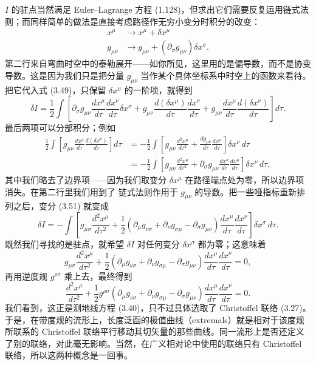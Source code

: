 $I$ 的驻点当然满足 Euler–Lagrange 方程 (1.128)，但求出它们需要反复运用链式法则；而同样简单的做法是直接考虑路径作无穷小变分时积分的改变：
\begin{align*}
x^\mu &\rightarrow x^\mu + \delta x^\mu\\
g_{\mu\nu} &\rightarrow g_{\mu\nu} + (\partial_\sigma g_{\mu\nu})\delta x^\sigma.
\tag{3.50}
\end{align*}
第二行来自弯曲时空中的泰勒展开——如你所见，这里用的是偏导数，而不是协变导数。这是因为我们只是把分量 $g_{\mu\nu}$ 当作某个具体坐标系中时空上的函数来看待。把它代入式 (3.49)，只保留 $\delta x^\mu$ 的一阶项，就得到
\begin{equation*}
\delta I = \frac{1}{2}\int\left[\partial_\sigma g_{\mu\nu}\frac{dx^\mu}{d\tau}\frac{dx^\nu}{d\tau}\delta x^\sigma + g_{\mu\nu}\frac{d(\delta x^\mu)}{d\tau}\frac{dx^\nu}{d\tau} + g_{\mu\nu}\frac{dx^\mu}{d\tau}\frac{d(\delta x^\nu)}{d\tau}\right]d\tau.
\tag{3.51}
\end{equation*}
最后两项可以分部积分；例如
\begin{align*}
\frac{1}{2}\int\left[g_{\mu\nu}\frac{dx^\mu}{d\tau}\frac{d(\delta x^\nu)}{d\tau}\right]d\tau &= -\frac{1}{2}\int\left[g_{\mu\nu}\frac{d^2x^\mu}{d\tau^2} + \frac{dg_{\mu\nu}}{d\tau}\frac{dx^\mu}{d\tau}\right]\delta x^\nu\,d\tau\\
&= -\frac{1}{2}\int\left[g_{\mu\nu}\frac{d^2x^\mu}{d\tau^2} + \partial_\sigma g_{\mu\nu}\frac{dx^\sigma}{d\tau}\frac{dx^\mu}{d\tau}\right]\delta x^\nu\,d\tau,
\tag{3.52}
\end{align*}
其中我们略去了边界项——因为我们取变分 $\delta x^\mu$ 在路径端点处为零，所以边界项消失。在第二行里我们用到了
链式法则作用于 $g_{\mu\nu}$ 的导数。把一些哑指标重新排列之后，变分 (3.51) 就变成
\begin{equation*}
\delta I = -\int\left[g_{\mu\sigma}\frac{d^2x^\mu}{d\tau^2} + \frac{1}{2}\left(\partial_\mu g_{\nu\sigma} + \partial_\nu g_{\sigma\mu} - \partial_\sigma g_{\mu\nu}\right)\frac{dx^\mu}{d\tau}\frac{dx^\nu}{d\tau}\right]\delta x^\sigma\,d\tau.
\tag{3.53}
\end{equation*}
既然我们寻找的是驻点，就希望 $\delta I$ 对任何变分 $\delta x^\sigma$ 都为零；这意味着
\begin{equation*}
g_{\mu\sigma}\frac{d^2x^\mu}{d\tau^2} + \frac{1}{2}\left(\partial_\mu g_{\nu\sigma} + \partial_\nu g_{\sigma\mu} - \partial_\sigma g_{\mu\nu}\right)\frac{dx^\mu}{d\tau}\frac{dx^\nu}{d\tau} = 0,
\tag{3.54}
\end{equation*}
再用逆度规 $g^{\rho\sigma}$ 乘上去，最终得到
\begin{equation*}
\frac{d^2x^\rho}{d\tau^2} + \frac{1}{2}g^{\rho\sigma}\left(\partial_\mu g_{\nu\sigma} + \partial_\nu g_{\sigma\mu} - \partial_\sigma g_{\mu\nu}\right)\frac{dx^\mu}{d\tau}\frac{dx^\nu}{d\tau} = 0.
\tag{3.55}
\end{equation*}
我们看到，这正是测地线方程 (3.40)，只不过具体选取了 Christoffel 联络 (3.27)。于是，在带度规的流形上，长度泛函的极值曲线（extremals）就是相对于该度规所联系的 Christoffel 联络平行移动其切矢量的那些曲线。同一流形上是否还定义了别的联络，对此毫无影响。当然，在广义相对论中使用的联络只有 Christoffel 联络，所以这两种概念是一回事。

